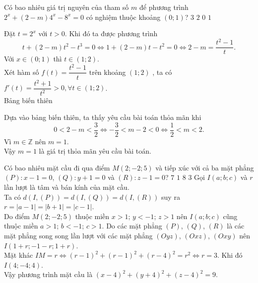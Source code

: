 \begin{ex}%
 Có bao nhiêu giá trị nguyên của tham số $m$ để phương trình $2^x + (2-m)4^x - 8^x = 0$ có nghiệm thuộc khoảng $(0;1)$?
 \choice
  {$3$}
  {$2$}
  {$0$}
  {\True $1$}
 \loigiai
  {
  Đặt $t = 2^x$ với $t > 0$. Khi đó ta được phương trình
  $$t + (2-m)t^2 - t^3 = 0 \Leftrightarrow 1 + (2-m)t - t^2 = 0 \Leftrightarrow 2-m = \dfrac{t^2-1}{t}.$$
  Với $x \in (0;1)$ thì $t \in (1;2)$.\\
  Xét hàm số $f(t) = \dfrac{t^2-1}{t}$ trên khoảng $(1;2)$ , ta có $f'(t) = \dfrac{t^2+1}{t^2} > 0, \forall t \in (1;2)$.\\
  Bảng biến thiên
  \begin{center}
  \end{center}
  Dựa vào bảng biến thiên, ta thấy yêu cầu bài toán thỏa mãn khi $$0<2-m<\dfrac{3}{2} \Leftrightarrow -\dfrac{3}{2}<m-2<0 \Leftrightarrow \dfrac{1}{2}<m<2.$$
  Vì $m \in \mathbb{Z}$ nên $m = 1$.\\
  Vậy $m = 1$ là giá trị thỏa mãn yêu cầu bài toán.
  }
\end{ex}


\begin{ex}%
 Có bao nhiêu mặt cầu đi qua điểm $M(2;-2;5)$ và tiếp xúc với cả ba mặt phẳng $(P)\colon x-1=0$, $(Q)\colon y+1=0$ và $(R)\colon z-1=0$?
 \choice
  {$7$}
  {\True $1$}
  {$8$}
  {$3$}
 \loigiai
  {
  Gọi $I(a;b;c)$ và $r$ lần lượt là tâm và bán kính của mặt cầu.\\
  Ta có $d(I,(P)) = d(I,(Q)) = d(I,(R))$ suy ra $r = |a-1| = |b+1| = |c-1|$.\\
  Do điểm $M(2;-2;5)$ thuộc miền $x>1$; $y<-1$; $z>1$ nên $I(a;b;c)$ cũng thuộc miền $a>1$; $b<-1$; $c>1$. Do các mặt phẳng $(P)$, $(Q)$, $(R)$ là các mặt phẳng song song lần lượt với các mặt phẳng $(Oyz)$, $(Oxz)$, $(Oxy)$ nên $I(1+r; -1-r; 1+r)$.\\
  Mặt khác $IM = r \Leftrightarrow (r-1)^2 + (r-1)^2 + (r-4)^2 = r^2 \Leftrightarrow r = 3$. Khi đó $I(4;-4;4)$.\\
  Vậy phương trình mặt cầu là $(x-4)^2 + (y+4)^2 + (z-4)^2 = 9$.
  }
\end{ex}


